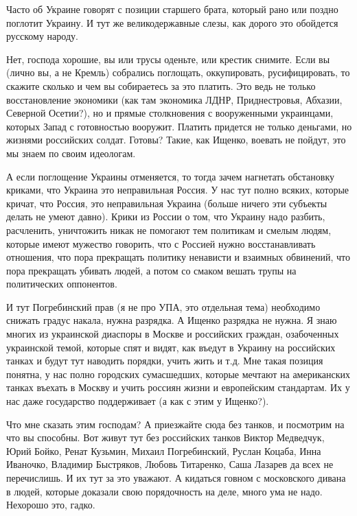 Часто об Украине говорят с позиции старшего брата, который рано или поздно
поглотит Украину. И тут же великодержавные слезы, как дорого это обойдется
русскому народу. 

Нет, господа хорошие, вы или трусы оденьте, или крестик снимите. Если вы (лично
вы, а не Кремль) собрались поглощать, оккупировать, русифицировать, то скажите
сколько и чем вы собираетесь за это платить. Это ведь не только восстановление
экономики (как там экономика ЛДНР, Приднестровья, Абхазии, Северной Осетии?),
но и прямые столкновения с вооруженными украинцами, которых Запад с готовностью
вооружит. Платить придется не только деньгами, но жизнями российских солдат.
Готовы? Такие, как Ищенко, воевать не пойдут, это мы знаем по своим идеологам. 

А если поглощение Украины отменяется, то тогда зачем нагнетать обстановку
криками, что Украина это неправильная Россия. У нас тут полно всяких, которые
кричат, что Россия, это неправильная Украина (больше ничего эти субъекты делать
не умеют давно). Крики из России о том, что Украину надо разбить, расчленить,
уничтожить никак не помогают тем политикам и смелым людям, которые имеют
мужество говорить, что с Россией нужно восстанавливать отношения, что пора
прекращать политику ненависти и взаимных обвинений, что пора прекращать убивать
людей, а потом со смаком вешать трупы на политических оппонентов.  

И тут Погребинский прав (я не про УПА, это отдельная тема) необходимо снижать
градус накала, нужна разрядка. А Ищенко разрядка не нужна. Я знаю многих из
украинской диаспоры в Москве и российских граждан, озабоченных украинской
темой, которые спят и видят, как въедут в Украину на российских танках и будут
тут наводить порядки, учить жить и т.д. Мне такая позиция понятна, у нас полно
городских сумасшедших, которые мечтают на американских танках въехать в Москву
и учить россиян жизни и европейским стандартам. Их у нас даже государство
поддерживает (а как с этим у Ищенко?). 

Что мне сказать этим господам? А приезжайте сюда без танков, и посмотрим на что
вы способны. Вот живут тут без российских танков Виктор Медведчук, Юрий Бойко,
Ренат Кузьмин, Михаил Погребинский, Руслан Коцаба, Инна Иваночко, Владимир
Быстряков, Любовь Титаренко, Саша Лазарев да всех не перечислишь. И их тут за
это уважают. А кидаться говном с московского дивана в людей, которые доказали
свою порядочность на деле, много ума не надо. Нехорошо это, гадко.
